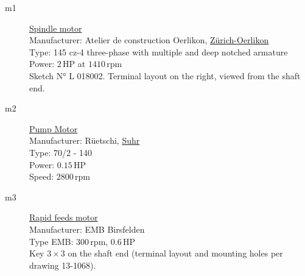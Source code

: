 \begin{description}
    \item[m1] \underline{Spindle motor} \\
    Manufacturer: Atelier de construction Oerlikon, \underline{Zürich-Oerlikon} \\
    Type: 145 cz-4 three-phase with multiple and deep notched armature \\
    Power: $2\,\mathrm{HP}$ at $1410\,\mathrm{rpm}$ \\
    Sketch N° L 018002. Terminal layout on the right, viewed from the shaft end.

    \item[m2] \underline{Pump Motor} \\
    Manufacturer: Rüetschi, \underline{Suhr} \\
    Type: 70/2 - 140 \\
    Power: $0.15\,\mathrm{HP}$ \\
    Speed: $2800\,\mathrm{rpm}$

    \item[m3] \underline{Rapid feeds motor} \\
    Manufacturer: EMB Birsfelden \\
    Type EMB: $300\,\mathrm{rpm}$, $0.6\,\mathrm{HP}$ \\
    Key $3 \times 3$ on the shaft end (terminal layout and mounting holes per drawing 13-1068).
\end{description}
